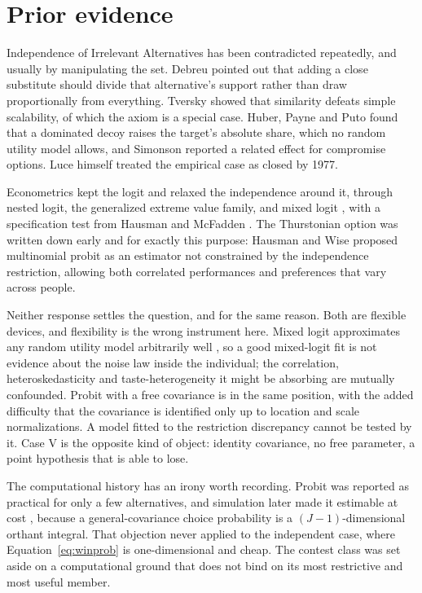 \documentclass[11pt]{article}
\begin{document}
\section{Prior evidence}
\label{sec:lit}

Independence of Irrelevant Alternatives has been contradicted repeatedly, and
usually by manipulating the set. Debreu \cite{debreu1960} pointed out that adding a
close substitute should divide that alternative's support rather than draw
proportionally from everything. Tversky \cite{tversky1972} showed that similarity
defeats simple scalability, of which the axiom is a special case. Huber, Payne and
Puto \cite{huber1982} found that a dominated decoy raises the target's absolute
share, which no random utility model allows, and Simonson \cite{simonson1989}
reported a related effect for compromise options. Luce \cite{luce1977} himself
treated the empirical case as closed by 1977.

Econometrics kept the logit and relaxed the independence around it, through nested
logit, the generalized extreme value family, and mixed logit
\cite{mcfaddentrain2000}, with a specification test from Hausman and McFadden
\cite{hausman1984}. The Thurstonian option was written down early and for exactly
this purpose: Hausman and Wise \cite{hausman1978} proposed multinomial probit as an
estimator not constrained by the independence restriction, allowing both correlated
performances and preferences that vary across people.

Neither response settles the question, and for the same reason. Both are flexible
devices, and flexibility is the wrong instrument here. Mixed logit approximates any
random utility model arbitrarily well \cite{mcfaddentrain2000}, so a good mixed-logit
fit is not evidence about the noise law inside the individual; the correlation,
heteroskedasticity and taste-heterogeneity it might be absorbing are mutually
confounded. Probit with a free covariance is in the same position, with the added
difficulty that the covariance is identified only up to location and scale
normalizations. A model fitted to the restriction discrepancy cannot be tested by
it. Case V is the opposite kind of object: identity covariance, no free parameter,
a point hypothesis that is able to lose.

The computational history has an irony worth recording. Probit was reported as
practical for only a few alternatives, and simulation later made it estimable at
cost \cite{train2009}, because a general-covariance choice probability is a
$(J-1)$-dimensional orthant integral. That objection never applied to the
independent case, where Equation~\eqref{eq:winprob} is one-dimensional and cheap.
The contest class was set aside on a computational ground that does not bind on its
most restrictive and most useful member.
\end{document}
